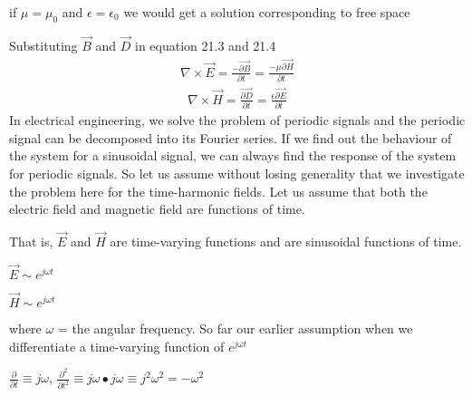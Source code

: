 if $\mu=\mu_{0}$ and $\epsilon=\epsilon_{0}$ we would get a solution corresponding to free space

Substituting $\vec{B}$ and 	$\vec{D}$ in equation 21.3 and 21.4
\begin{align}
\nabla\times\vec{E}=\frac{-\vec{\partial B}}{\partial t}=\frac{-\mu\vec{\partial H}}{\partial t}
\end{align}
\begin{align}
\nabla\times\vec{H}=\frac{\vec{\partial D}}{\partial t}=\frac{\epsilon\vec{\partial E}}{\partial t}
\end{align}
In electrical engineering, we solve the problem of periodic signals and the periodic signal can be decomposed into its Fourier series. If we find out the behaviour of the system for a sinusoidal signal, we can always find the response of the system for periodic signals. So let us assume without losing generality that we investigate the problem here for the time-harmonic fields. Let us assume that both the electric field and magnetic field are functions of time.

That is, $\vec{E}$ and $\vec{H}$ are time-varying functions and are sinusoidal functions of time.

$\vec{E} \sim e^{j\omega t}$

$\vec{H} \sim e^{j\omega t}$

where 
$\omega$ = the angular frequency.
So far our earlier assumption when we differentiate a time-varying function of $e^{j\omega t}$

$\frac{\partial}{\partial t} \equiv j\omega$, 
$\frac{\partial^2}{\partial t^2} \equiv j\omega \bullet j\omega \equiv j^2\omega^2=-\omega^2$

